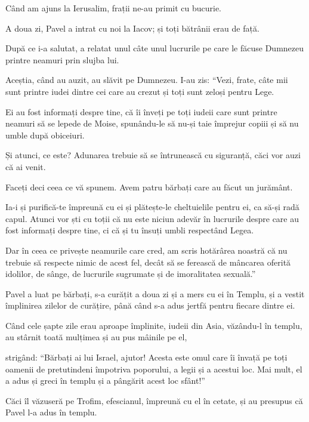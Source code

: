 {\par }{\PP {}Când am ajuns la Ierusalim, frații ne-au primit cu bucurie.

A doua zi, Pavel a intrat cu noi la Iacov; și toți bătrânii erau de față.

După ce i-a salutat, a relatat unul câte unul lucrurile pe care le făcuse Dumnezeu printre neamuri prin slujba lui.

Aceștia, când au auzit, au slăvit pe Dumnezeu. I-au zis: “Vezi, frate, câte mii sunt printre iudei dintre cei care au crezut și toți sunt zeloși pentru Lege.

Ei au fost informați despre tine, că îi înveți pe toți iudeii care sunt printre neamuri să se lepede de Moise, spunându-le să nu-și taie împrejur copiii și să nu umble după obiceiuri.

Și atunci, ce este? Adunarea trebuie să se întrunească cu siguranță, căci vor auzi că ai venit.

Faceți deci ceea ce vă spunem. Avem patru bărbați care au făcut un jurământ.

Ia-i și purifică-te împreună cu ei și plătește-le cheltuielile pentru ei, ca să-și radă capul. Atunci vor ști cu toții că nu este niciun adevăr în lucrurile despre care au fost informați despre tine, ci că și tu însuți umbli respectând Legea.

Dar în ceea ce privește neamurile care cred, am scris hotărârea noastră că nu trebuie să respecte nimic de acest fel, decât să se ferească de mâncarea oferită idolilor, de sânge, de lucrurile sugrumate și de imoralitatea sexuală.”


\par }{\PP {}Pavel a luat pe bărbați, s-a curățit a doua zi și a mers cu ei în Templu, și a vestit împlinirea zilelor de curățire, până când s-a adus jertfă pentru fiecare dintre ei.

Când cele șapte zile erau aproape împlinite, iudeii din Asia, văzându-l în templu, au stârnit toată mulțimea și au pus mâinile pe el,

strigând: “Bărbați ai lui Israel, ajutor! Acesta este omul care îi învață pe toți oamenii de pretutindeni împotriva poporului, a legii și a acestui loc. Mai mult, el a adus și greci în templu și a pângărit acest loc sfânt!”

Căci îl văzuseră pe Trofim, efescianul, împreună cu el în cetate, și au presupus că Pavel l-a adus în templu.


}

